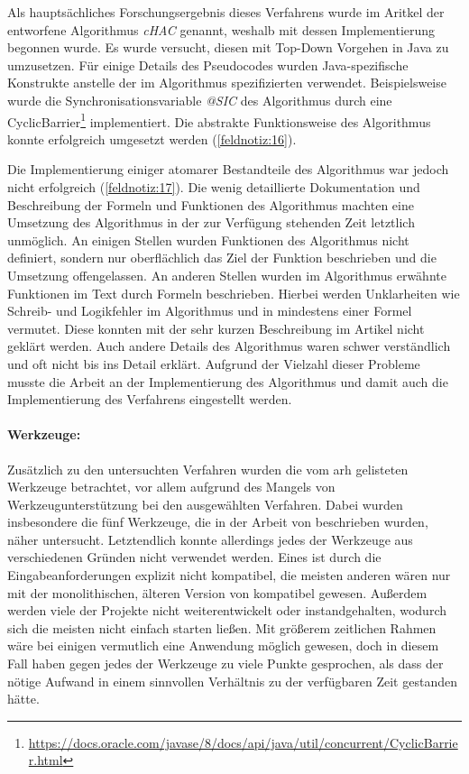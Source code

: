 Als hauptsächliches Forschungsergebnis dieses Verfahrens wurde im Aritkel der entworfene Al\-go\-rith\-mus \emph{cHAC} genannt, weshalb mit dessen Implementierung begonnen wurde.
Es wurde versucht, diesen mit Top-Down Vorgehen in Java zu umzusetzen.
Für einige Details des Pseu\-do\-codes wurden Java-spezifische Konstrukte anstelle der im Algorithmus spezifizierten verwendet.
Beispielsweise wurde die Synchronisationsvariable \emph{@SIC} des Algorithmus durch eine CyclicBarrier\footnote{\url{https://docs.oracle.com/javase/8/docs/api/java/util/concurrent/CyclicBarrier.html}} implementiert.
Die abstrakte Funktionsweise des Algorithmus konnte erfolgreich umgesetzt werden (\cref{feldnotiz:16}).

Die Implementierung einiger atomarer Bestandteile des Algorithmus war jedoch nicht erfolgreich (\cref{feldnotiz:17}).
Die wenig detaillierte Dokumentation und Beschreibung der Formeln und Funktionen des Algorithmus machten eine Umsetzung des Algorithmus in der zur Verfügung stehenden Zeit letztlich unmöglich.
An einigen Stellen wurden Funktionen des Algorithmus nicht definiert, sondern nur oberflächlich das Ziel der Funktion beschrieben und die Umsetzung offengelassen.
An anderen Stellen wurden im Algorithmus erwähnte Funktionen im Text durch Formeln beschrieben.
Hierbei werden Unklarheiten wie Schreib- und Logikfehler im Algorithmus und in mindestens einer Formel vermutet.
Diese konnten mit der sehr kurzen Beschreibung im Artikel nicht geklärt werden.
Auch andere Details des Algorithmus waren schwer verständlich und oft nicht bis ins Detail erklärt.
Aufgrund der Vielzahl dieser Probleme musste die Arbeit an der Implementierung des Algorithmus und damit auch die Implementierung des Verfahrens eingestellt werden.

\paragraph{Werkzeuge:} Zusätzlich zu den untersuchten Verfahren wurden die vom \gls{arh} gelisteten Werk\-zeu\-ge betrachtet, vor allem aufgrund des Mangels von Werkzeugunterstützung bei den aus\-ge\-wähl\-ten Verfahren.
Dabei wurden insbesondere die fünf Werkzeuge, die in der Arbeit von  beschrieben wurden, näher untersucht.
Letztendlich konnte allerdings jedes der Werkzeuge aus verschiedenen Gründen nicht verwendet werden.
Eines ist durch die Eingabeanforderungen explizit nicht kompatibel, die meisten anderen wären nur mit der monolithischen, älteren Version von \jf kompatibel gewesen.
Außerdem werden viele der Projekte nicht weiterentwickelt oder instandgehalten, wodurch sich die meisten nicht einfach starten ließen.
Mit größerem zeitlichen Rahmen wäre bei einigen vermutlich eine Anwendung möglich gewesen, doch in diesem Fall haben gegen jedes der Werkzeuge zu viele Punkte gesprochen, als dass der nötige Aufwand in einem sinnvollen Verhältnis zu der verfügbaren Zeit gestanden hätte.

